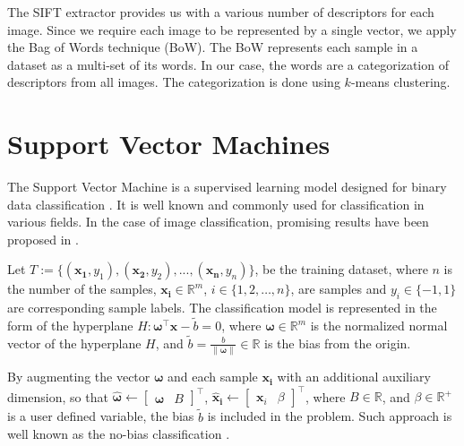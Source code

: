 \documentclass{aip-cp}
\newcommand{\norm}[1]{\left\lVert#1\right\rVert}
\begin{document}
The SIFT extractor provides us with a various number of descriptors for each image. Since we require each image to be represented by a single vector, we apply the Bag of Words technique (BoW). The BoW represents each sample in a dataset as a multi-set of its words. In our case, the words are a categorization of descriptors from all images. The categorization is done using $k$-means clustering.

\section{Support Vector Machines}
The Support Vector Machine is a supervised learning model designed for binary data classification \cite{boser1992}. It is well known and commonly used for classification in various fields. In the case of image classification, promising results have been proposed in \cite{dornak2020}.

Let $T := \{(\boldsymbol{x_1}, y_1),(\boldsymbol{x_2}, y_2),...,(\boldsymbol{x_n}, y_n)\}$,
be the training dataset, where $n$ is the number of the samples, $\boldsymbol{x_i} \in \mathbb{R}^m$, $i \in \{1,2,\dots,n\}$,
are samples and $y_i \in \{-1, 1\}$ are corresponding sample labels. The classification model is represented in the form of the hyperplane $H: \boldsymbol{\omega}^\top\boldsymbol{x}-\widetilde{b}=0$, where $\boldsymbol{\omega} \in \mathbb{R}^{m}$ is the normalized normal vector of the hyperplane $H$, and $\widetilde{b} = \frac{b}{\norm{\boldsymbol{\omega}}} \in \mathbb{R}$ is the bias from the origin.

By augmenting the vector $\boldsymbol{\omega}$ and each sample $\boldsymbol{x_i}$ with an additional auxiliary dimension, so that $\boldsymbol{\widehat{\omega}} \leftarrow \begin{bmatrix}\boldsymbol{\omega} & B \end{bmatrix}^\top$, $\boldsymbol{\widehat{x}_i} \leftarrow \begin{bmatrix}\boldsymbol{x}_i & \beta \end{bmatrix}^\top$, where $B \in \mathbb{R}$, and $\beta \in \mathbb{R}^+$ is a user defined variable, the bias $\widetilde{b}$ is included in the problem. Such approach is well known as the no-bias classification \cite{Aeta2018}.
\end{document}
